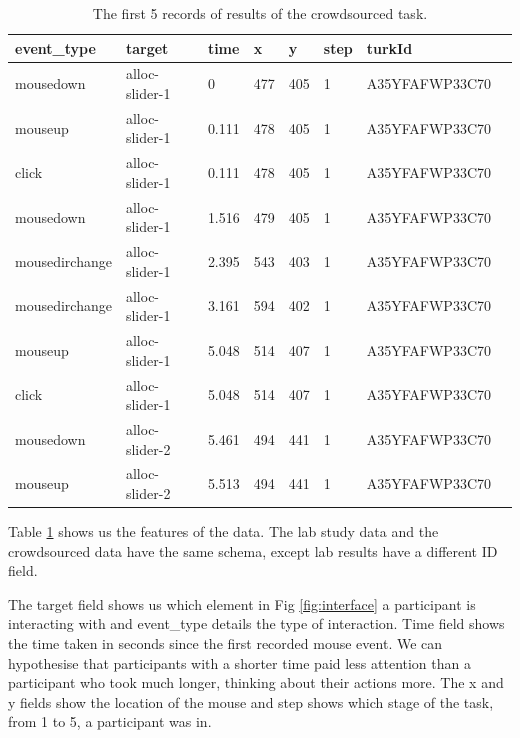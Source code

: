 \documentclass{article}
\begin{document}
\begin{table}[ht]
    \caption{\label{table:data} The first 5 records of results of the crowdsourced task.}

    \begin{tabular}{llllllll}
        \hline
        event\_type    & target         & time  & x   & y   & step & turkId         \\ \hline
        mousedown      & alloc-slider-1 & 0     & 477 & 405 & 1    & A35YFAFWP33C70 \\
        mouseup        & alloc-slider-1 & 0.111 & 478 & 405 & 1    & A35YFAFWP33C70 \\
        click          & alloc-slider-1 & 0.111 & 478 & 405 & 1    & A35YFAFWP33C70 \\
        mousedown      & alloc-slider-1 & 1.516 & 479 & 405 & 1    & A35YFAFWP33C70 \\
        mousedirchange & alloc-slider-1 & 2.395 & 543 & 403 & 1    & A35YFAFWP33C70 \\
        mousedirchange & alloc-slider-1 & 3.161 & 594 & 402 & 1    & A35YFAFWP33C70 \\
        mouseup        & alloc-slider-1 & 5.048 & 514 & 407 & 1    & A35YFAFWP33C70 \\
        click          & alloc-slider-1 & 5.048 & 514 & 407 & 1    & A35YFAFWP33C70 \\
        mousedown      & alloc-slider-2 & 5.461 & 494 & 441 & 1    & A35YFAFWP33C70 \\
        mouseup        & alloc-slider-2 & 5.513 & 494 & 441 & 1    & A35YFAFWP33C70 \\ \hline
    \end{tabular}
\end{table}

Table \ref{table:data} shows us the features of the data.
The lab study data and the crowdsourced data have the same schema, except lab results have a different ID field.

The target field shows us which element in Fig \ref{fig:interface} a participant is interacting with and event\_type details the type of interaction.
Time field shows the time taken in seconds since the first recorded mouse event.
We can hypothesise that participants with a shorter time paid less attention than a participant who took much longer, thinking about their actions more.
The x and y fields show the location of the mouse and step shows which stage of the task, from 1 to 5, a participant was in.

\end{document}
